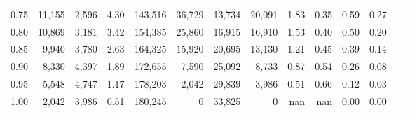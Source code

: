 \begin{tabular}{rrrrrrrrrrrrrr}
0.75 &  11,155 &  2,596 &    4.30 &  143,516 &   36,729 &  13,734 &  20,091 &  1.83 &  0.35 &  0.59 &      0.27 \\
0.80 &  10,869 &  3,181 &    3.42 &  154,385 &   25,860 &  16,915 &  16,910 &  1.53 &  0.40 &  0.50 &      0.20 \\
0.85 &   9,940 &  3,780 &    2.63 &  164,325 &   15,920 &  20,695 &  13,130 &  1.21 &  0.45 &  0.39 &      0.14 \\
0.90 &   8,330 &  4,397 &    1.89 &  172,655 &    7,590 &  25,092 &   8,733 &  0.87 &  0.54 &  0.26 &      0.08 \\
0.95 &   5,548 &  4,747 &    1.17 &  178,203 &    2,042 &  29,839 &   3,986 &  0.51 &  0.66 &  0.12 &      0.03 \\
1.00 &   2,042 &  3,986 &    0.51 &  180,245 &        0 &  33,825 &       0 &   nan &   nan &  0.00 &      0.00 \\
\bottomrule
\end{tabular}
